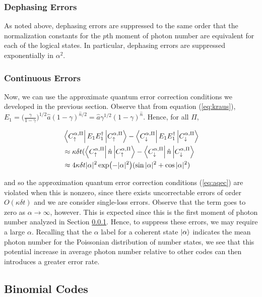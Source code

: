 \documentclass[12]{amsart}
\newcommand\0{\mathbf{0}}
\newcommand\<{\langle}
\renewcommand\>{\rangle}
\begin{document}
\subsubsection{Dephasing Errors}
\label{sec:cat-deph}

As noted above, dephasing errors are suppressed to the same order that the normalization constants for the $p$th moment of photon number are equivalent for each of the logical states. In particular, dephasing errors are suppressed exponentially in $\alpha^2$.

\subsubsection{Continuous Errors}

Now, we can use the approximate quantum error correction conditions we developed in the previous section. Observe that from equation (\ref{eq:kraus}), $E_1 = \Big(\frac{\gamma}{1-\gamma}\Big)^{1 / 2} \hat{a} (1 - \gamma)^{\hat{n} / 2} = \hat{a} \gamma^{1/2} (1- \gamma)^{\hat{n}}$. Hence, for all $\Pi$,

\begin{align*}
&\bra{C^{\alpha, \Pi}_{\uparrow}}E_1E_1^\dag\ket{C^{\alpha, \Pi}_{\uparrow}} - \bra{C^{\alpha, \Pi}_{\downarrow}}	E_1E_1^\dag\ket{C^{\alpha, \Pi}_{\downarrow}}	\\
&\approx \kappa\delta t (\bra{C^{\alpha, \Pi}_{\uparrow}}\hat{n}\ket{C^{\alpha, \Pi}_{\uparrow}} - \bra{C^{\alpha, \Pi}_{\downarrow}}	\hat{n}\ket{C^{\alpha, \Pi}_{\downarrow}}\\
&\approx 4 \kappa \delta t |\alpha|^2  \exp(-|\alpha|^2)(\sin |\alpha|^2 + \cos|\alpha|^2)
\end{align*}

and so the approximation quantum error correction conditions (\ref{eq:aqec}) are violated when this is nonzero, since there exists uncorrectable errors of order $O(\kappa \delta t)$ and we are consider single-loss errors. Observe that the term goes to zero as $\alpha\rightarrow \infty$, however. This is expected since this is the first moment of photon number analyzed in Section \ref{sec:cat-deph}. Hence, to suppress these errors, we may require a large $\alpha$. Recalling that the $\alpha$ label for a coherent state $\ket{\alpha}$ indicates the mean photon number for the Poissonian distribution of number states, we see that this potential increase in average photon number relative to other codes can then introduces a greater error rate.

\subsection{Binomial Codes}
\end{document}
